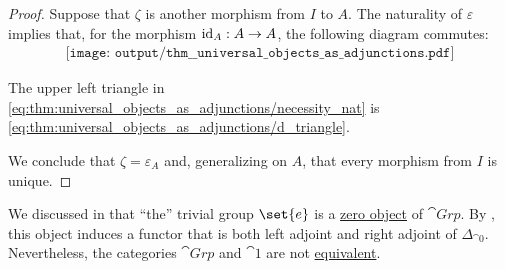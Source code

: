 \begin{proof}
  Suppose that \( \zeta \) is another morphism from \( I \) to \( A \). The naturality of \( \varepsilon \) implies that, for the morphism \( \operatorname{id}_A: A \to A \), the following diagram commutes:
  \begin{equation}\label{eq:thm:universal_objects_as_adjunctions/necessity_nat}
    \begin{aligned}
      \texttt{[image: output/thm\_\_universal\_objects\_as\_adjunctions.pdf]}
    \end{aligned}
  \end{equation}

  The upper left triangle in \eqref{eq:thm:universal_objects_as_adjunctions/necessity_nat} is \eqref{eq:thm:universal_objects_as_adjunctions/d_triangle}.

  We conclude that \( \zeta = \varepsilon_A \) and, generalizing on \( A \), that every morphism from \( I \) is unique.
\end{proof}

\begin{remark}\label{rem:left_and_right_adjoint_not_equivalence}
  We discussed in  that \enquote{the} trivial group \( \set{ e } \) is a \hyperref[def:universal_objects/zero]{zero object} of \( \cat{Grp} \). By , this object induces a functor that is both left adjoint and right adjoint of \( \Delta_{\cat{0}} \). Nevertheless, the categories \( \cat{Grp} \) and \( \cat{1} \) are not \hyperref[def:equivalence_of_categories]{equivalent}.
\end{remark}
